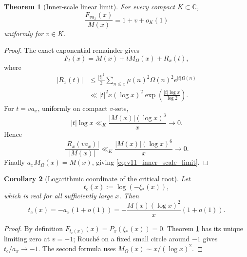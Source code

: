 \documentclass[11pt]{amsart}
\numberwithin{equation}{section}
\theoremstyle{plain}
\newtheorem{theorem}{Theorem}[section]
\newtheorem{corollary}[theorem]{Corollary}
\theoremstyle{definition}
\theoremstyle{remark}
\begin{document}
\begin{theorem}[Inner-scale linear limit]
\label{thm:v11_inner_scale}
For every compact \(K\subset\mathbb C\),
\begin{equation}
\boxed{
\frac{F_{v a_x}(x)}{M(x)}
=1+v+o_K(1)}
\label{eq:v11_inner_scale_limit}
\end{equation}
uniformly for \(v\in K\).
\end{theorem}

\begin{proof}
The exact exponential remainder gives
\begin{equation}
F_t(x)
=M(x)+tM_\Omega(x)+R_x(t),
\label{eq:v11_Ft_linear_expansion}
\end{equation}
where
\begin{align}
|R_x(t)|
&\le
\frac{|t|^2}{2}
\sum_{n\le x}\mu(n)^2\Omega(n)^2e^{|t|\Omega(n)}
\label{eq:v11_Rx_exp_bound1}\\
&\ll |t|^2x(\log x)^2
\exp\left(\frac{|t|\log x}{\log2}\right).
\label{eq:v11_Rx_exp_bound2}
\end{align}
For \(t=va_x\), uniformly on compact \(v\)-sets,
\begin{equation}
|t|\log x
\ll_K\frac{|M(x)|(\log x)^3}{x}\to0.
\label{eq:v11_tlog_small}
\end{equation}
Hence
\begin{equation}
\frac{|R_x(va_x)|}{|M(x)|}
\ll_K
\frac{|M(x)|(\log x)^6}{x}\to0.
\label{eq:v11_Rx_over_M}
\end{equation}
Finally \(a_xM_\Omega(x)=M(x)\), giving
\eqref{eq:v11_inner_scale_limit}.
\end{proof}

\begin{corollary}[Logarithmic coordinate of the critical root]
\label{cor:v11_tc}
Let
\begin{equation}
t_c(x):=\log(-\xi_*(x)),
\label{eq:v11_tc_def}
\end{equation}
which is real for all sufficiently large \(x\).  Then
\begin{equation}
\boxed{
 t_c(x)=-a_x(1+o(1))
 =-\frac{M(x)(\log x)^2}{x}(1+o(1)).}
\label{eq:v11_tc_asymptotic}
\end{equation}
\end{corollary}

\begin{proof}
By definition \(F_{t_c(x)}(x)=P_x(\xi_*(x))=0\).  Theorem
\ref{thm:v11_inner_scale} has its unique limiting zero at \(v=-1\); Rouch\'e
on a fixed small circle around \(-1\) gives
\(t_c/a_x\to-1\).  The second formula uses
\(M_\Omega(x)\sim x/(\log x)^2\).
\end{proof}
\end{document}
